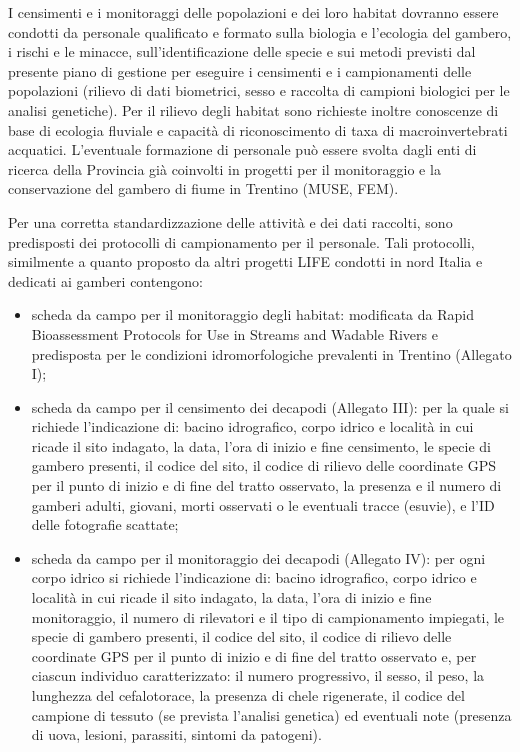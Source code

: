 \documentclass[11pt,a4paper,italian,twoside,openany]{memoir}
\begin{document}
I censimenti e i monitoraggi delle popolazioni e dei loro habitat dovranno essere condotti da personale qualificato e formato sulla biologia e l'ecologia del gambero, i rischi e le minacce, sull'identificazione delle specie e sui metodi previsti dal presente piano di gestione per eseguire i censimenti e i campionamenti delle popolazioni (rilievo di dati biometrici, sesso e raccolta di campioni biologici per le analisi genetiche). Per il rilievo degli habitat sono richieste inoltre conoscenze di base di ecologia fluviale e capacità di riconoscimento di taxa di macroinvertebrati acquatici. L'eventuale formazione di personale può essere svolta dagli enti di ricerca della Provincia già coinvolti in progetti per il monitoraggio e la conservazione del gambero di fiume in Trentino (MUSE, FEM). 

Per una corretta standardizzazione delle attività e dei dati raccolti, sono predisposti dei protocolli di campionamento per il personale. Tali protocolli, similmente a quanto proposto da altri progetti LIFE condotti in nord Italia e dedicati ai gamberi \cite{CRAINAT}\cite{RARITY} contengono: 
\begin{itemize}
  \item scheda da campo per il monitoraggio degli habitat: modificata da Rapid Bioassessment Protocols for Use in Streams and Wadable Rivers e predisposta per le condizioni idromorfologiche prevalenti in Trentino (Allegato I);
  \item scheda da campo per il censimento dei decapodi (Allegato III): per la quale si richiede l'indicazione di: bacino idrografico, corpo idrico e località in cui ricade il sito indagato, la data, l'ora di inizio e fine censimento, le specie di gambero presenti, il codice del sito, il codice di rilievo delle coordinate GPS per il punto di inizio e di fine del tratto osservato, la presenza e il numero di gamberi adulti, giovani, morti osservati o le eventuali tracce (esuvie), e l'ID delle fotografie scattate;
  \item scheda da campo per il monitoraggio dei decapodi (Allegato IV): per ogni corpo idrico si richiede l'indicazione di: bacino idrografico, corpo idrico e località in cui ricade il sito indagato, la data, l'ora di inizio e fine monitoraggio, il numero di rilevatori e il tipo di campionamento impiegati, le specie di gambero presenti, il codice del sito, il codice di rilievo delle coordinate GPS per il punto di inizio e di fine del tratto osservato e, per ciascun individuo caratterizzato: il numero progressivo, il sesso, il peso, la lunghezza del cefalotorace, la presenza di chele rigenerate, il codice del campione di tessuto (se prevista l'analisi genetica) ed eventuali note (presenza di uova, lesioni, parassiti, sintomi da patogeni).
\end{itemize}
\end{document}
